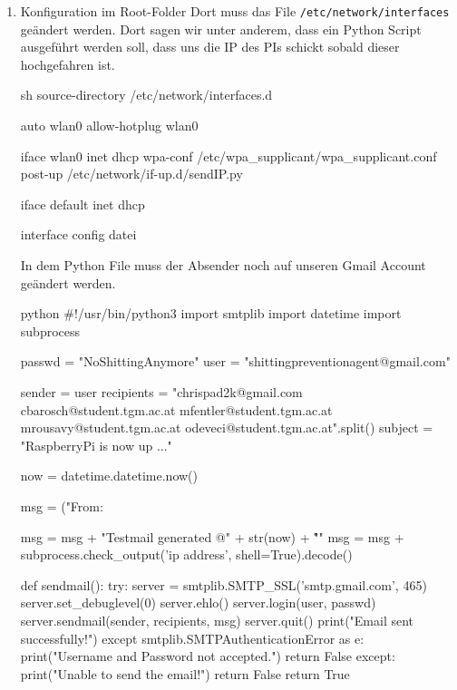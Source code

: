 \begin{enumerate}
    \item Konfiguration im Root-Folder
    Dort muss das File \texttt{/etc/network/interfaces} geändert werden. Dort sagen wir unter anderem, dass ein Python Script ausgeführt werden soll, dass uns die IP des PIs schickt sobald dieser hochgefahren ist.

    \begin{listing}
        \begin{code}[firstnumber=last]{sh}
            source-directory /etc/network/interfaces.d

            auto wlan0
            allow-hotplug wlan0


            iface wlan0 inet dhcp
                wpa-conf /etc/wpa_supplicant/wpa_supplicant.conf
                post-up /etc/network/if-up.d/sendIP.py

            iface default inet dhcp
        \end{code}
        \caption{interface config datei}
    \end{listing}

    In dem Python File muss der Absender noch auf unseren Gmail Account geändert werden.

    \begin{listing}
        \begin{code}[firstnumber=last]{python}
            #!/usr/bin/python3
            import smtplib
            import datetime
            import subprocess

            passwd = "NoShittingAnymore"
            user = "shittingpreventionagent@gmail.com"

            sender = user
            recipients = "chrispad2k@gmail.com cbarosch@student.tgm.ac.at mfentler@student.tgm.ac.at mrousavy@student.tgm.ac.at odeveci@student.tgm.ac.at".split()
            subject = "RaspberryPi is now up ..."

            now = datetime.datetime.now()

            msg = ("From: %

            msg = msg + "Testmail generated @" + str(now) + "\r\n\r\n"
            msg = msg + subprocess.check_output('ip address', shell=True).decode()

            def sendmail():
                try:
                    server = smtplib.SMTP_SSL('smtp.gmail.com', 465)
                    server.set_debuglevel(0)
                    server.ehlo()
                    server.login(user, passwd)
                    server.sendmail(sender, recipients, msg)
                    server.quit()
                    print("Email sent successfully!")
                except smtplib.SMTPAuthenticationError as e:
                    print("Username and Password not accepted.")
                    return False
                except:
                    print("Unable to send the email!")
                    return False
                return True


\end{code}
\end{listing}
\end{enumerate}
